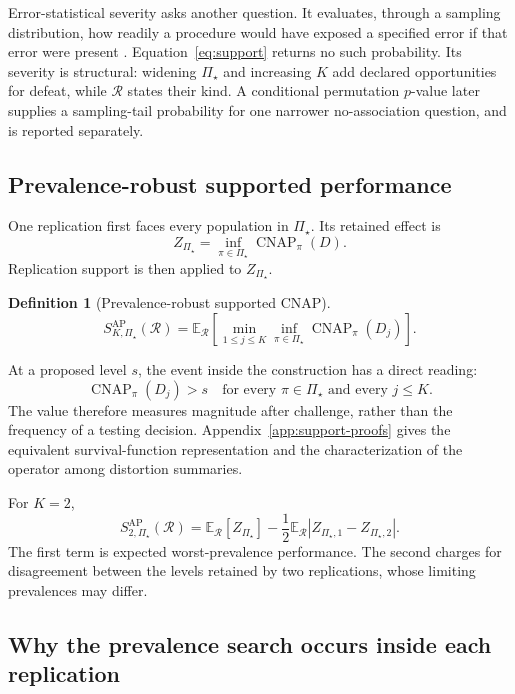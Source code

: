 \documentclass[11pt]{article}
\newcommand{\CNAP}{\operatorname{CNAP}}
\newcommand{\Regime}{\mathcal{R}}
\newcommand{\PSet}{\Pi_\star}
\newcommand{\E}{\mathbb{E}}
\newcommand{\SRob}{S_{K,\PSet}^{\mathrm{AP}}(\Regime)}
\newtheorem{definition}{Definition}
\theoremstyle{remark}
\begin{document}
Error-statistical severity asks another question. It evaluates, through a sampling distribution, how readily a procedure would have exposed a specified error if that error were present \cite{mayo1996error}. Equation~\eqref{eq:support} returns no such probability. Its severity is structural: widening $\PSet$ and increasing $K$ add declared opportunities for defeat, while $\Regime$ states their kind. A conditional permutation $p$-value later supplies a sampling-tail probability for one narrower no-association question, and is reported separately.

\subsection{Prevalence-robust supported performance}

One replication first faces every population in $\PSet$. Its retained effect is
\[
Z_{\PSet}
=
\inf_{\pi\in\PSet}\CNAP_\pi(D).
\]
Replication support is then applied to $Z_{\PSet}$.

\begin{definition}[Prevalence-robust supported CNAP]
\begin{equation}
\SRob
=
\E_{\Regime}
\left[
\min_{1\leq j\leq K}
\inf_{\pi\in\PSet}\CNAP_\pi(D_j)
\right].
\label{eq:robust-support}
\end{equation}
\end{definition}

At a proposed level $s$, the event inside the construction has a direct reading:
\[
\CNAP_\pi(D_j)>s
\quad
\text{for every }\pi\in\PSet
\text{ and every }j\leq K.
\]
The value therefore measures magnitude after challenge, rather than the frequency of a testing decision. Appendix~\ref{app:support-proofs} gives the equivalent survival-function representation and the characterization of the operator among distortion summaries.

For $K=2$,
\begin{equation}
S_{2,\PSet}^{\mathrm{AP}}(\Regime)
=
\E_{\Regime}[Z_{\PSet}]
-
\frac12\E_{\Regime}|Z_{\PSet,1}-Z_{\PSet,2}|.
\label{eq:robust-k2}
\end{equation}
The first term is expected worst-prevalence performance. The second charges for disagreement between the levels retained by two replications, whose limiting prevalences may differ.

\subsection{Why the prevalence search occurs inside each replication}
\label{sec:order}
\end{document}
